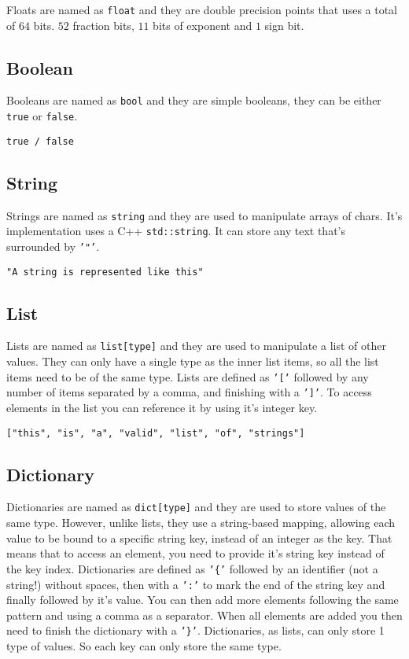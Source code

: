 Floats are named as \texttt{float} and they are double precision points that uses a total of $64$ bits. $52$ fraction bits, $11$ bits
of exponent and $1$ sign bit.

\subsection{Boolean}

Booleans are named as \texttt{bool} and they are simple booleans, they can be either \texttt{true} or \texttt{false}.

\begin{center}
    \texttt{true / false}
\end{center}

\subsection{String}

Strings are named as \texttt{string} and they are used to manipulate arrays of chars. It's implementation uses
a C++ \texttt{std::string}. It can store any text that's surrounded by \texttt{'"'}.

\begin{center}
    \texttt{"A string is represented like this"}
\end{center}

\subsection{List}

Lists are named as \texttt{list[type]} and they are used to manipulate a list of other values. They can only have a single
type as the inner list items, so all the list items need to be of the same type. Lists are defined as \texttt{'['} followed
by any number of items separated by a comma, and finishing with a \texttt{']'}. To access elements in the list you can
reference it by using it's integer key.

\begin{center}
    \texttt{["this", "is", "a", "valid", "list", "of", "strings"]}
\end{center}

\subsection{Dictionary}

Dictionaries are named as \texttt{dict[type]} and they are used to store values of the same type. However, unlike lists, they
use a string-based mapping, allowing each value to be bound to a specific string key, instead of an integer as the key.
That means that to access an element, you need to provide it's string key instead of the key index.
Dictionaries are defined as \texttt{'\{'} followed by an identifier (not a string!) without spaces,
then with a \texttt{':'} to mark the end of the string key and finally followed by it's value.
You can then add more elements following the same pattern and using a comma as a separator.
When all elements are added you then need to finish the dictionary with a \texttt{'\}'}.
Dictionaries, as lists, can only store 1 type of values. So each key can only store the same type.

